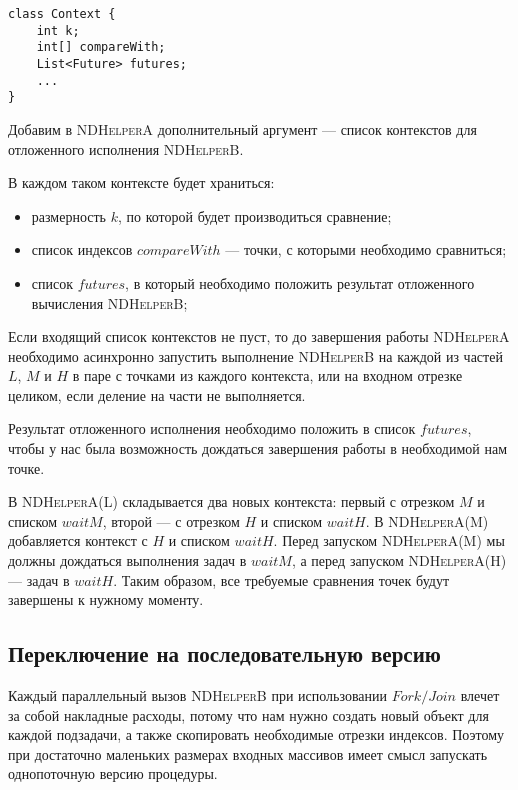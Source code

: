 \begin{lstlisting}[float=!h,caption={Вспомогательная структура <<контекст>> для \textsc{NDHelperA}}]
class Context {
    int k;
    int[] compareWith;
    List<Future> futures;
    ...
}
\end{lstlisting}

Добавим в \textsc{NDHelperA} дополнительный аргумент --- список контекстов для отложенного исполнения \textsc{NDHelperB}.

В каждом таком контексте будет храниться:
\begin{itemize}
    \item размерность $k$, по которой будет производиться сравнение;
    \item список индексов $compareWith$ --- точки, с которыми необходимо сравниться;
    \item список $futures$, в который необходимо положить результат отложенного вычисления \textsc{NDHelperB};
\end{itemize}

Если входящий список контекстов не пуст, то до завершения работы \textsc{NDHelperA} необходимо асинхронно запустить выполнение \textsc{NDHelperB} на каждой из частей $L$, $M$ и $H$ в паре с точками из каждого контекста, или на входном отрезке целиком, если деление на части не выполняется.

Результат отложенного исполнения необходимо положить в список $futures$, чтобы у нас была возможность дождаться завершения работы в необходимой нам точке.

В \textsc{NDHelperA(L)} складывается два новых контекста: первый с отрезком $M$ и списком $waitM$, второй --- с отрезком $H$ и списком $waitH$.
В \textsc{NDHelperA(M)} добавляется контекст с $H$ и списком $waitH$.
Перед запуском \textsc{NDHelperA(M)} мы должны дождаться выполнения задач в $waitM$, а перед запуском \textsc{NDHelperA(H)} --- задач в $waitH$.
Таким образом, все требуемые сравнения точек будут завершены к нужному моменту.

\subsection{Переключение на последовательную версию}
Каждый параллельный вызов \textsc{NDHelperB} при использовании $Fork/Join$ влечет за собой накладные расходы, потому что нам нужно создать новый объект для каждой подзадачи, а также скопировать необходимые отрезки индексов.
Поэтому при достаточно маленьких размерах входных массивов имеет смысл запускать однопоточную версию процедуры.

